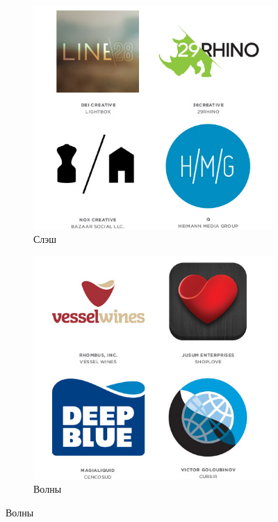 \begin{figure}[h!]
  \vfill

  \centering
  \begin{subfigure}{.45\textwidth}
    \centering
    \includegraphics[width=\linewidth]{images/supplement/logolounge/2013/Slesh}
    \caption[]{Слэш}
    \label{fig:logolounge:2013:slesh}
  \end{subfigure}
  \hfill
  \centering
  \begin{subfigure}{.45\textwidth}
    \centering
    \includegraphics[width=\linewidth]{images/supplement/logolounge/2013/Volni}
    \caption[]{Волны}
    \label{fig:logolounge:2013:volni}
  \end{subfigure}
\end{figure}

